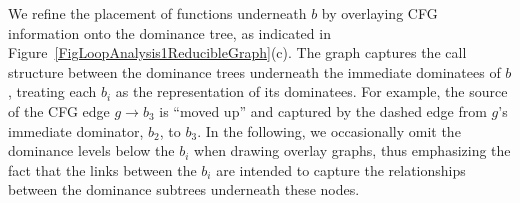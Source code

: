 We refine the placement of functions underneath $b$ by overlaying CFG
information onto the dominance tree, as indicated in
Figure~\ref{FigLoopAnalysis1ReducibleGraph}(c). The graph captures the
call structure between the dominance trees underneath the immediate
dominatees of $b$, treating each $b_i$ as the representation of its
dominatees. For example, the source of the CFG edge $g \to b_3$ is
``moved up'' and captured by the dashed edge from $g$'s immediate
dominator, $b_2$, to $b_3$. In the following, we occasionally omit the
dominance levels below the $b_i$ when drawing overlay graphs, thus
emphasizing the fact that the links between the $b_i$ are intended to
capture the relationships between the dominance subtrees underneath
these nodes.

